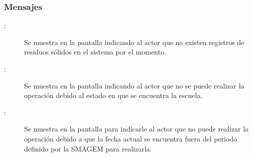 \subsubsection{Mensajes}

    \begin{description}
	\item [:] Se muestra en la pantalla  indicando al actor que no existen registros de residuos sólidos en el sistema por el momento.
	
	\item [:] Se muestra en la pantalla  indicando al actor que no se puede realizar la operación debido al estado en que se encuentra la escuela.
	    
	    \item [:] Se muestra en la pantalla  para indicarle al actor que no puede realizar la operación debido a que la fecha actual se encuentra fuera del periodo definido por la SMAGEM para realizarla.
    \end{description}